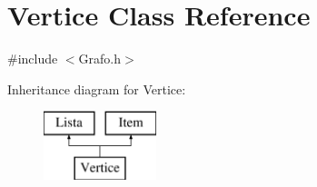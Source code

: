 \hypertarget{class_vertice}{\section{Vertice Class Reference}
\label{class_vertice}
}


{\ttfamily \#include $<$Grafo.\-h$>$}

Inheritance diagram for Vertice\-:\begin{figure}[H]
\begin{center}
\leavevmode
\includegraphics[height=2.000000cm]{class_vertice}
\end{center}
\end{figure}
